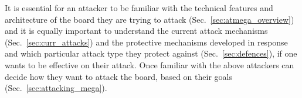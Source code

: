 	It is essential for an attacker to be familiar with the technical features and architecture of the board they are trying to attack (Sec.~\ref{sec:atmega_overview}) and it is equally important to understand the current attack mechanisms (Sec.~\ref{sec:curr_attacks}) and the protective mechanisms developed in response and which particular attack type they protect against (Sec.~\ref{sec:defences}), if one wants to be effective on their attack. Once familiar with the above attackers can decide how they want to attack the board, based on their goals (Sec.~\ref{sec:attacking_mega}).